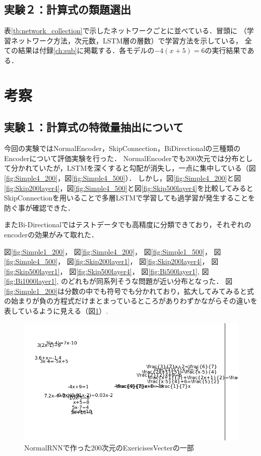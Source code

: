 \documentclass[a4j,11pt,report]{jsbook}
\begin{document}
\clearpage
\subsection{実験２：計算式の類題選出}
表\ref{tb:network_collection}で示したネットワークごとに並べている．冒頭に
（学習ネットワーク方法，次元数，LSTM層の層数）で学習方法を示している，
全ての結果は付録\ref{ch:sub}に掲載する．各モデルの$-4(x+5)=6$の実行結果である．

\clearpage

\section{考察}

\subsection{実験１：計算式の特徴量抽出について}
今回の実験ではNormalEncoder，SkipConnection，BiDirectionalの三種類のEncoderについて評価実験を行った．
NormalEncoderでも200次元では分布として分かれていたが，LSTMを深くすると勾配が消失し，一点に集中している（図\ref{fig:Simple4_200}，図\ref{fig:Simple4_500}）．
しかし，図\ref{fig:Simple4_200}と図\ref{fig:Skip200layer4}，図\ref{fig:Simple4_500}と図\ref{fig:Skip500layer4}を比較してみると
SkipConnectionを用いることで多層LSTMで学習しても過学習が発生することを防ぐ事が確認できた．

またBi-Directionalではテストデータでも高精度に分類できており，それぞれのencoderの効果がみて取れた．

図\ref{fig:Simple1_200}，
図\ref{fig:Simple4_200}，
図\ref{fig:Simple1_500}，
図\ref{fig:Simple4_500}，
図\ref{fig:Skip200layer1}，
図\ref{fig:Skip200layer4}，
図\ref{fig:Skip500layer1}，
図\ref{fig:Skip500layer4}，
図\ref{fig:Bi500layer1},
図\ref{fig:Bi1000layer1},
のどれもが同系列そうな問題が近い分布となった．
図\ref{fig:Simple1_200}は分数の中でも符号でも分かれており，拡大してみてみると式の始まりが負の方程式だけまとまっているところがありわずかながらその違いを表しているように見える（図\ref{fig:normal200cut}）.


\begin{center}
  \begin{figure}[H]
    \centering
    \includegraphics[width=\linewidth]{image/detial/pca_formula_EV_final_22x200_1_cut.png}
    \caption{NormalRNNで作った200次元のExericisesVecterの一部}
    \label{fig:normal200cut}
  \end{figure}
\end{center}
\end{document}
